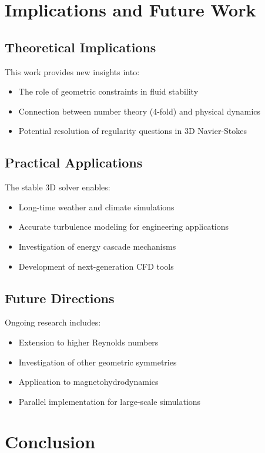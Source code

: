 \documentclass[conference]{IEEEtran}
\begin{document}
\section{Implications and Future Work}

\subsection{Theoretical Implications}

This work provides new insights into:
\begin{itemize}
\item The role of geometric constraints in fluid stability
\item Connection between number theory (4-fold) and physical dynamics
\item Potential resolution of regularity questions in 3D Navier-Stokes
\end{itemize}

\subsection{Practical Applications}

The stable 3D solver enables:
\begin{itemize}
\item Long-time weather and climate simulations
\item Accurate turbulence modeling for engineering applications
\item Investigation of energy cascade mechanisms
\item Development of next-generation CFD tools
\end{itemize}

\subsection{Future Directions}

Ongoing research includes:
\begin{itemize}
\item Extension to higher Reynolds numbers
\item Investigation of other geometric symmetries
\item Application to magnetohydrodynamics
\item Parallel implementation for large-scale simulations
\end{itemize}

\section{Conclusion}
\end{document}
